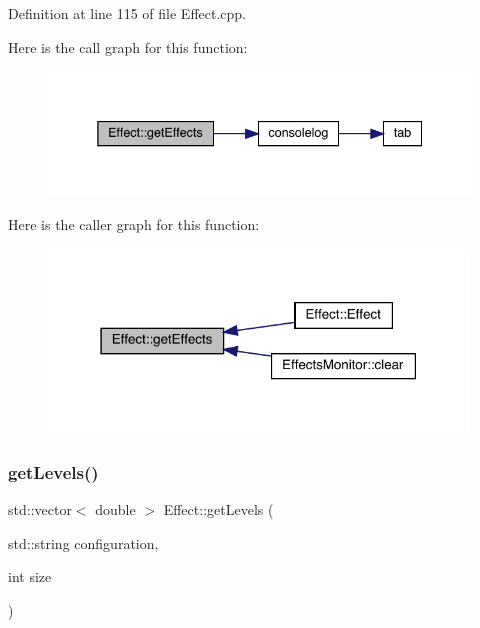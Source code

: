 Definition at line 115 of file Effect.\+cpp.

Here is the call graph for this function\+:
\nopagebreak
\begin{figure}[H]
\begin{center}
\leavevmode
\includegraphics[width=338pt]{class_effect_a2165f76956c91baf1482d2405eb1ed4e_cgraph}
\end{center}
\end{figure}
Here is the caller graph for this function\+:
\nopagebreak
\begin{figure}[H]
\begin{center}
\leavevmode
\includegraphics[width=316pt]{class_effect_a2165f76956c91baf1482d2405eb1ed4e_icgraph}
\end{center}
\end{figure}
\mbox{\label{class_effect_ad0f19e11abff1f815c8b3b36b1f28c92}} 
\subsubsection{\texorpdfstring{get\+Levels()}{getLevels()}}
{\footnotesize\ttfamily std\+::vector$<$ double $>$ Effect\+::get\+Levels (\begin{DoxyParamCaption}\item[{std\+::string}]{configuration,  }\item[{int}]{size }\end{DoxyParamCaption})\hspace{0.3cm}{\ttfamily [static]}}


